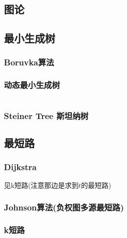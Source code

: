 \documentclass[a4paper]{article}
\begin{document}
\begin{multicols}{2}
		\section{图论}

			\subsection{最小生成树}
				\subsubsection{Boruvka算法}
					
				
				\subsubsection{动态最小生成树}
					\inputminted{cpp}{../src/graph/动态最小生成树.cpp}
				

				
				\subsubsection{Steiner Tree 斯坦纳树}
					
			
			
			\subsection{最短路}
				\subsubsection{Dijkstra}
					见k短路(注意那边是求到$t$的最短路)
				
				\subsubsection{Johnson算法(负权图多源最短路)}
					
				


				\subsubsection{k短路}
					\inputminted{cpp}{../src/graph/k短路.cpp}
			

\end{multicols}
\end{document}
